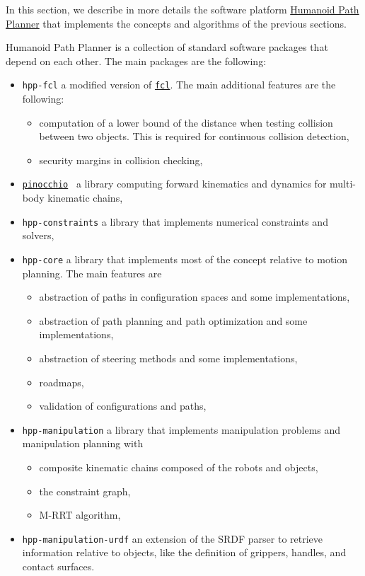 In this section, we describe in more details the software platform
\href{https://humanoid-path-planner.github.io/hpp-doc}{Humanoid Path
  Planner} that implements the concepts and algorithms of the previous
sections.

Humanoid Path Planner is a collection of standard software packages that depend
on each other. The main packages are the following:
\begin{itemize}
\item \texttt{hpp-fcl} a modified version of \href{https://github.com/flexible-collision-library/fcl}{\texttt{fcl}}. The main additional features are the following:
  \begin{itemize}
  \item computation of a lower bound of the distance when testing collision
    between two objects. This is required for continuous collision detection,
  \item security margins in collision checking,
  \end{itemize}
\item \href{https://stack-of-tasks.github.io/pinocchio}{\texttt{pinocchio}}~\cite{pinocchio} a library computing forward kinematics and dynamics for multi-body kinematic chains,
\item \texttt{hpp-constraints} a library that implements numerical constraints
  and solvers,
\item \texttt{hpp-core} a library that implements most of the concept relative
  to motion planning. The main features are
  \begin{itemize}
  \item abstraction of paths in configuration spaces and some implementations,
  \item abstraction of path planning and path optimization and some implementations,
  \item abstraction of steering methods and some implementations,
  \item roadmaps,
  \item validation of configurations and paths,
  \end{itemize}
\item \texttt{hpp-manipulation} a library that implements manipulation
  problems and manipulation planning with
  \begin{itemize}
    \item composite kinematic chains composed of the robots and objects,
    \item the constraint graph,
    \item M-RRT algorithm,
  \end{itemize}
\item \texttt{hpp-manipulation-urdf} an extension of the SRDF parser to retrieve
  information relative to objects, like the definition of grippers, handles, and
  contact surfaces.
\end{itemize}
